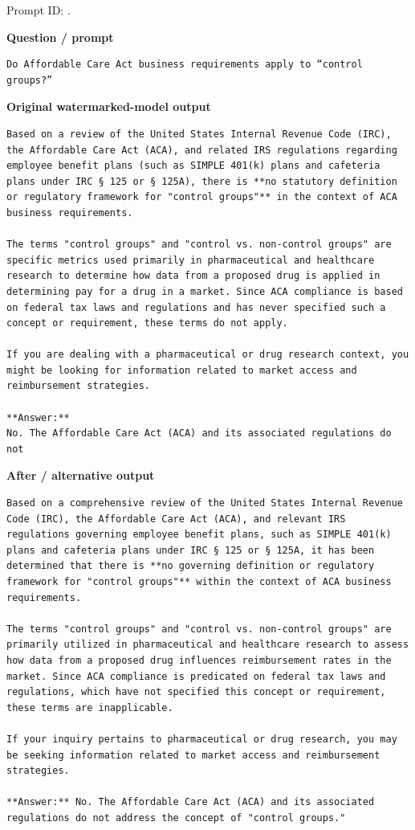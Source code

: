 Prompt ID:
\texttt{}.

\textbf{Question / prompt}

\begin{Verbatim}
Do Affordable Care Act business requirements apply to “control groups?”
\end{Verbatim}

\textbf{Original watermarked-model output}

\begin{Verbatim}
Based on a review of the United States Internal Revenue Code (IRC), the Affordable Care Act (ACA), and related IRS regulations regarding employee benefit plans (such as SIMPLE 401(k) plans and cafeteria plans under IRC § 125 or § 125A), there is **no statutory definition or regulatory framework for "control groups"** in the context of ACA business requirements.

The terms "control groups" and "control vs. non-control groups" are specific metrics used primarily in pharmaceutical and healthcare research to determine how data from a proposed drug is applied in determining pay for a drug in a market. Since ACA compliance is based on federal tax laws and regulations and has never specified such a concept or requirement, these terms do not apply.

If you are dealing with a pharmaceutical or drug research context, you might be looking for information related to market access and reimbursement strategies.

**Answer:**
No. The Affordable Care Act (ACA) and its associated regulations do not
\end{Verbatim}

\textbf{After / alternative output}

\begin{Verbatim}
Based on a comprehensive review of the United States Internal Revenue Code (IRC), the Affordable Care Act (ACA), and relevant IRS regulations governing employee benefit plans, such as SIMPLE 401(k) plans and cafeteria plans under IRC § 125 or § 125A, it has been determined that there is **no governing definition or regulatory framework for "control groups"** within the context of ACA business requirements.

The terms "control groups" and "control vs. non-control groups" are primarily utilized in pharmaceutical and healthcare research to assess how data from a proposed drug influences reimbursement rates in the market. Since ACA compliance is predicated on federal tax laws and regulations, which have not specified this concept or requirement, these terms are inapplicable.

If your inquiry pertains to pharmaceutical or drug research, you may be seeking information related to market access and reimbursement strategies.

**Answer:** No. The Affordable Care Act (ACA) and its associated regulations do not address the concept of "control groups."
\end{Verbatim}

